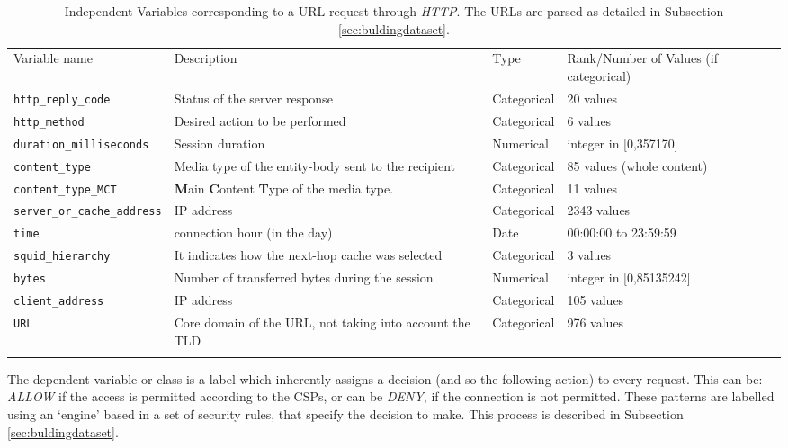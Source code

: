 \documentclass{llncs}
\begin{document}
\begin{table*}[htpb]
\centering
 \caption{\label{tabdata} Independent Variables corresponding to a URL
   request through \textit{HTTP}. The URLs are parsed as detailed in
   Subsection \ref{sec:buldingdataset}.} 
   
{\scriptsize
\begin{tabular}{llll}
\hline\noalign{\smallskip}
Variable name & Description & Type & Rank/Number of Values (if categorical)\\
\noalign{\smallskip}\hline\noalign{\smallskip}
\texttt{http\_reply\_code} & Status of the server response & Categorical & 20 values\\
\texttt{http\_method} & Desired action to be performed & Categorical & 6 values\\
\texttt{duration\_milliseconds} & Session duration & Numerical & integer in [0,357170]\\
\texttt{content\_type} & Media type of the entity-body sent to the recipient & Categorical & 85 values (whole content)\\
\texttt{content\_type\_MCT} & \textbf{M}ain \textbf{C}ontent \textbf{T}ype of the media type. & Categorical & 11 values\\
\texttt{server\_or\_cache\_address} & IP address & Categorical & 2343 values\\
\texttt{time} & connection hour (in the day) & Date & 00:00:00 to 23:59:59\\
\texttt{squid\_hierarchy} & It indicates how the next-hop cache was selected & Categorical & 3 values\\
\texttt{bytes} & Number of transferred bytes during the session & Numerical & integer in [0,85135242]\\
\texttt{client\_address} & IP address & Categorical & 105 values\\
\texttt{URL} & Core domain of the URL, not taking into account the TLD & Categorical & 976 values\\
\noalign{\smallskip}\hline
\end{tabular}
}
\end{table*}

The dependent variable or class is a label which inherently assigns a decision (and so the following action) to every request. This can be: \textit{ALLOW} if the access is permitted according to the CSPs, or can be \textit{DENY}, if the connection is not permitted. These patterns are labelled using an `engine' based in a set of security rules, that specify the decision to make. This process is described in Subsection \ref{sec:buldingdataset}.
\end{document}
